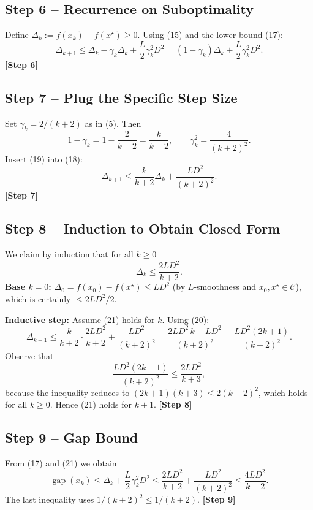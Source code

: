 \documentclass{article}
\newcommand{\gap}{\operatorname{gap}}
\begin{document}
\subsection*{Step 6 – Recurrence on Suboptimality}
Define $\Delta_{k}:=f(x_{k})-f(x^{\star})\ge0$.  
Using (15) and the lower bound (17):
\[
\Delta_{k+1}\le \Delta_{k}-\gamma_{k}\Delta_{k}
               +\frac{L}{2}\gamma_{k}^{2}D^{2}
            = (1-\gamma_{k})\Delta_{k}
              +\frac{L}{2}\gamma_{k}^{2}D^{2}. \tag{18}
\]
\textbf{[Step 6]}

\subsection*{Step 7 – Plug the Specific Step Size}
Set $\gamma_{k}=2/(k+2)$ as in (5). Then
\[
1-\gamma_{k}=1-\frac{2}{k+2}=\frac{k}{k+2},\qquad
\gamma_{k}^{2}= \frac{4}{(k+2)^{2}}. \tag{19}
\]
Insert (19) into (18):
\[
\Delta_{k+1}\le \frac{k}{k+2}\Delta_{k}
               +\frac{L D^{2}}{(k+2)^{2}}. \tag{20}
\]
\textbf{[Step 7]}

\subsection*{Step 8 – Induction to Obtain Closed Form}
We claim by induction that for all $k\ge0$
\[
\Delta_{k}\le \frac{2L D^{2}}{k+2}. \tag{21}
\]
\textbf{Base $k=0$:}  
$\Delta_{0}=f(x_{0})-f(x^{\star})\le L D^{2}$ (by $L$‑smoothness and $x_{0},x^{\star}\in\mathcal{C}$), which is certainly $\le 2L D^{2}/2$.

\textbf{Inductive step:} Assume (21) holds for $k$. Using (20):
\[
\Delta_{k+1}\le \frac{k}{k+2}\cdot\frac{2L D^{2}}{k+2}
               +\frac{L D^{2}}{(k+2)^{2}}
            =\frac{2L D^{2}\,k + L D^{2}}{(k+2)^{2}}
            =\frac{L D^{2}(2k+1)}{(k+2)^{2}}.
\]
Observe that
\[
\frac{L D^{2}(2k+1)}{(k+2)^{2}}
   \le \frac{2L D^{2}}{k+3},
\]
because the inequality reduces to $(2k+1)(k+3)\le 2(k+2)^{2}$, which holds for all $k\ge0$. Hence (21) holds for $k+1$.
\textbf{[Step 8]}

\subsection*{Step 9 – Gap Bound}
From (17) and (21) we obtain
\[
\gap(x_{k})\le \Delta_{k}+\frac{L}{2}\gamma_{k}^{2}D^{2}
            \le \frac{2L D^{2}}{k+2}+\frac{L D^{2}}{(k+2)^{2}}
            \le \frac{4L D^{2}}{k+2}. \tag{22}
\]
The last inequality uses $1/(k+2)^{2}\le 1/(k+2)$.
\textbf{[Step 9]}
\end{document}
